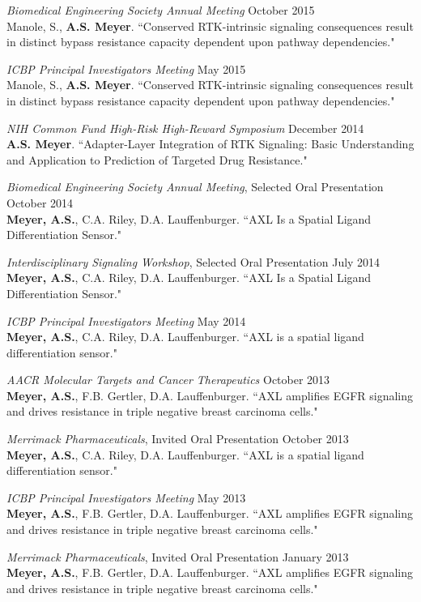 \documentclass[11pt]{res}
\begin{document}
\begin{resume}
{\sl Biomedical Engineering Society Annual Meeting} \hfill October 2015 \\
Manole, S., {\bf A.S. Meyer}. ``Conserved RTK-intrinsic signaling consequences result in distinct bypass resistance capacity dependent upon pathway dependencies."

{\sl ICBP Principal Investigators Meeting} \hfill May 2015 \\
Manole, S., {\bf A.S. Meyer}. ``Conserved RTK-intrinsic signaling consequences result in distinct bypass resistance capacity dependent upon pathway dependencies."

{\sl NIH Common Fund High-Risk High-Reward Symposium} \hfill December 2014 \\
{\bf A.S. Meyer}. ``Adapter-Layer Integration of RTK Signaling: Basic Understanding and Application to Prediction of Targeted Drug Resistance."

{\sl Biomedical Engineering Society Annual Meeting}, Selected Oral Presentation \hfill October 2014 \\
{\bf Meyer, A.S.}, C.A. Riley, D.A. Lauffenburger. ``AXL Is a Spatial Ligand Differentiation Sensor."

{\sl Interdisciplinary Signaling Workshop}, Selected Oral Presentation \hfill July 2014 \\
{\bf Meyer, A.S.}, C.A. Riley, D.A. Lauffenburger. ``AXL Is a Spatial Ligand Differentiation Sensor."

{\sl ICBP Principal Investigators Meeting} \hfill May 2014 \\
{\bf Meyer, A.S.}, C.A. Riley, D.A. Lauffenburger. ``AXL is a spatial ligand differentiation sensor."

{\sl AACR Molecular Targets and Cancer Therapeutics} \hfill October 2013 \\
{\bf Meyer, A.S.}, F.B. Gertler, D.A. Lauffenburger. ``AXL amplifies EGFR signaling and drives resistance in triple negative breast carcinoma cells."

{\sl Merrimack Pharmaceuticals}, Invited Oral Presentation \hfill October 2013 \\
{\bf Meyer, A.S.}, C.A. Riley, D.A. Lauffenburger. ``AXL is a spatial ligand differentiation sensor."

{\sl ICBP Principal Investigators Meeting} \hfill May 2013 \\
{\bf Meyer, A.S.}, F.B. Gertler, D.A. Lauffenburger. ``AXL amplifies EGFR signaling and drives resistance in triple negative breast carcinoma cells."

\clearpage
{\sl Merrimack Pharmaceuticals}, Invited Oral Presentation \hfill January 2013 \\
{\bf Meyer, A.S.}, F.B. Gertler, D.A. Lauffenburger. ``AXL amplifies EGFR signaling and drives resistance in triple negative breast carcinoma cells."


\end{resume}
\end{document}
